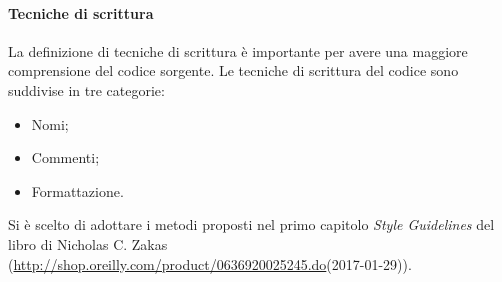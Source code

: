 \documentclass[../NormeDiProgetto_v3.0.0.tex]{subfiles}
\begin{document}
            \paragraph{Tecniche di scrittura}
                  La definizione di tecniche di scrittura è importante per avere una maggiore comprensione del codice sorgente. Le tecniche di scrittura del codice sono suddivise in tre categorie:
                  \begin{itemize}
                        \item Nomi;
                        \item Commenti;
                        \item Formattazione.
                  \end{itemize}
                  Si è scelto di adottare i metodi proposti nel primo capitolo \textit{Style Guidelines} del libro  di Nicholas C. Zakas (\url{http://shop.oreilly.com/product/0636920025245.do}(2017-01-29)).
                  
\end{document}
